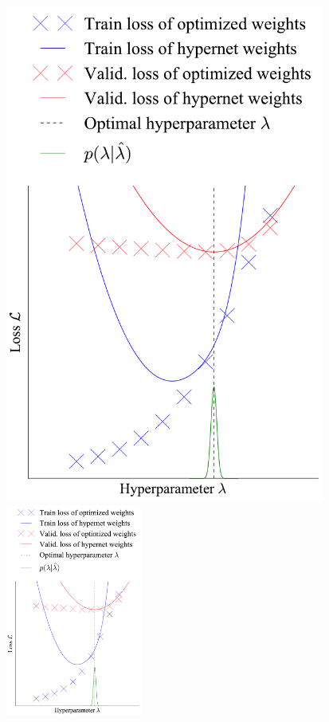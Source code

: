 \documentclass[landscape,a0b,final,a4resizeable]{include/a0poster}
\begin{document}
\begin{poster}
\begin{multicols}{3}
\begin{minipage}[c]{36cm}
\begin{center}
	\includegraphics[trim={0 0 0 11cm},clip,width=10.5cm]{figures/hypernets_local_small.pdf}
	\includegraphics[trim={0 22cm 0 0},clip,height=7cm]{figures/hypernets_local_small.pdf}
	\caption{
	Training and validation loss of a neural net for linear regression on MNIST, estimated by cross-validation (crosses) or by a hypernet (lines), which outputs $7,850$-dimensional network weights. 
	The training and validation loss can be cheaply evaluated at any hyperparameter value using a hypernet.
	Standard cross-validation requires training from scratch each time.
	\emph{Left:} A global approximation the best-response.
	\emph{Right:} A local approximation to the best-response.
	}
\end{center}
\end{minipage}
\vphantom{A}



\end{multicols}
\end{poster}
\end{document}
